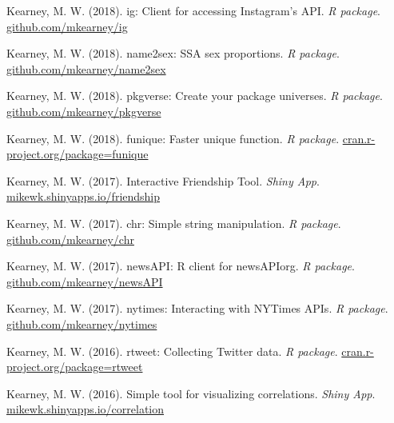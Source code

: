 \begin{bibenum}
  \item Kearney, M. W. (2018).
    ig: Client for accessing Instagram's API.
    \textit{R package}.
    \href{https://github.com/mkearney/ig}{github.com/mkearney/ig}

  \item Kearney, M. W. (2018).
    name2sex: SSA sex proportions.
    \textit{R package}.
    \href{https://github.com/mkearney/name2sex}{github.com/mkearney/name2sex}

  \item Kearney, M. W. (2018).
    pkgverse: Create your package universes.
    \textit{R package}.
    \href{https://github.com/mkearney/pkgverse}{github.com/mkearney/pkgverse}

  \item Kearney, M. W. (2018).
    funique: Faster unique function.
    \textit{R package}.
    \href{http://cran.r-project.org/package=funique}{cran.r-project.org/package=funique}

  \item Kearney, M. W. (2017).
    Interactive Friendship Tool.
    \textit{Shiny App}.
    \href{https://mikewk.shinyapps.io/friendship/}{mikewk.shinyapps.io/friendship}

  \item Kearney, M. W. (2017).
    chr: Simple string manipulation.
    \textit{R package}.
    \href{https://github.com/mkearney/chr}{github.com/mkearney/chr}

  \item Kearney, M. W. (2017).
    newsAPI: R client for newsAPIorg.
    \textit{R package}.
    \href{https://github.com/mkearney/newsAPI}{github.com/mkearney/newsAPI}

  \item Kearney, M. W. (2017).
    nytimes: Interacting with NYTimes APIs.
    \textit{R package}.
    \href{https://github.com/mkearney/nytimes}{github.com/mkearney/nytimes}

  \item Kearney, M. W. (2016).
    rtweet: Collecting Twitter data.
    \textit{R package}.
    \href{http://cran.r-project.org/package=rtweet}{cran.r-project.org/package=rtweet}

  \item Kearney, M. W. (2016).
    Simple tool for visualizing correlations.
    \textit{Shiny App}.
    \href{https://mikewk.shinyapps.io/correlation/}{mikewk.shinyapps.io/correlation}

\end{bibenum}
